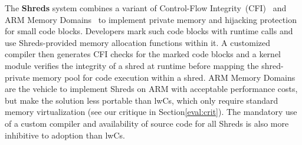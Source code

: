 \documentclass[10pt,twocolumn,a4paper]{article}
\begin{document}
The \textbf{Shreds} system combines a variant of Control-Flow Integrity~(CFI)~\cite{abadi2009control} and ARM Memory Domains~\cite{armmemorydomains} to implement private memory and hijacking protection for small code blocks.
Developers mark such code blocks with runtime calls and use Shreds-provided memory allocation functions within it.
A customized compiler then generates CFI checks for the marked code blocks
and a kernel module verifies the integrity of a shred at runtime before mapping the shred-private memory pool for code execution within a shred.
ARM Memory Domains are the vehicle to implement Shreds on ARM with acceptable performance costs, but make the solution less portable than lwCs, which only require standard memory virtualization (see our critique in Section\ref{eval:crit}).
The mandatory use of a custom compiler and availability of source code for all Shreds is also more inhibitive to adoption than lwCs.
\cite{chen2016shreds}

  
  
\end{document}
